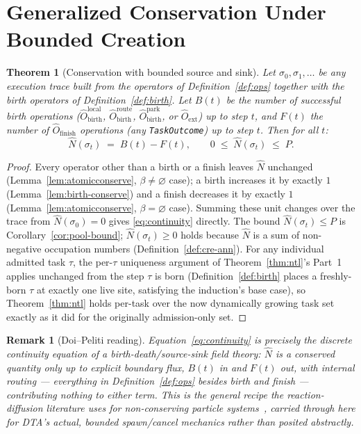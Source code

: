 \documentclass[11pt,a4paper]{report}
\newtheorem{theorem}{Theorem}[section]
\newtheorem{remark}{Remark}[section]
\newcommand{\Num}{\hat{N}}
\newcommand{\code}[1]{\texttt{#1}}
\newcommand{\dtact}{\textsc{DTA}}
\begin{document}
\section{Generalized Conservation Under Bounded Creation}
\label{sec:gen-conserve}

\begin{theorem}[Conservation with bounded source and sink]
\label{thm:gen-conserve}
Let $\sigma_0, \sigma_1, \ldots$ be any execution trace built from the
operators of Definition~\ref{def:ops} together with the birth
operators of Definition~\ref{def:birth}. Let $B(t)$ be the number of
successful birth operations ($\hat{O}_{\text{birth}}^{\text{local}}$,
$\hat{O}_{\text{birth}}^{\text{route}}$, $\hat{O}_{\text{birth}}^{\text{park}}$,
or $\hat{O}_{\text{ext}}$) up
to step $t$, and $F(t)$ the number of $\hat{O}_{\text{finish}}$
operations (any \code{TaskOutcome}) up to step $t$. Then for all $t$:
\begin{equation}
  \Num(\sigma_t) \;=\; B(t) - F(t), \qquad 0 \;\leq\; \Num(\sigma_t) \;\leq\; P.
  \label{eq:continuity}
\end{equation}
\end{theorem}

\begin{proof}
Every operator other than a birth or a finish leaves $\Num$ unchanged
(Lemma~\ref{lem:atomicconserve}, $\beta \neq \varnothing$ case); a
birth increases it by exactly $1$ (Lemma~\ref{lem:birth-conserve}) and
a finish decreases it by exactly $1$
(Lemma~\ref{lem:atomicconserve}, $\beta = \varnothing$ case). Summing
these unit changes over the trace from $\Num(\sigma_0) = 0$ gives
\eqref{eq:continuity} directly. The bound $\Num(\sigma_t) \leq P$ is
Corollary~\ref{cor:pool-bound}; $\Num(\sigma_t) \geq 0$ holds because
$\Num$ is a sum of non-negative occupation numbers
(Definition~\ref{def:cre-ann}). For any individual admitted task
$\tau$, the per-$\tau$ uniqueness argument of
Theorem~\ref{thm:ntl}'s Part~1 applies unchanged from the step $\tau$
is born (Definition~\ref{def:birth} places a freshly-born $\tau$ at
exactly one live site, satisfying the induction's base case), so
Theorem~\ref{thm:ntl} holds per-task over the now dynamically growing
task set exactly as it did for the originally admission-only set.
\end{proof}

\begin{remark}[Doi--Peliti reading]
Equation~\eqref{eq:continuity} is precisely the discrete continuity
equation of a birth-death/source-sink field theory: $\Num$ is a
conserved quantity only up to explicit boundary flux, $B(t)$ in and
$F(t)$ out, with internal routing --- everything in
Definition~\ref{def:ops} besides birth and finish --- contributing
nothing to either term. This is the general recipe the
reaction-diffusion literature uses for non-conserving particle
systems~\cite{doi1976,peliti1985,tauber2005}, carried through here for
\dtact{}'s actual, bounded spawn/cancel mechanics rather than posited
abstractly.
\end{remark}
\end{document}
